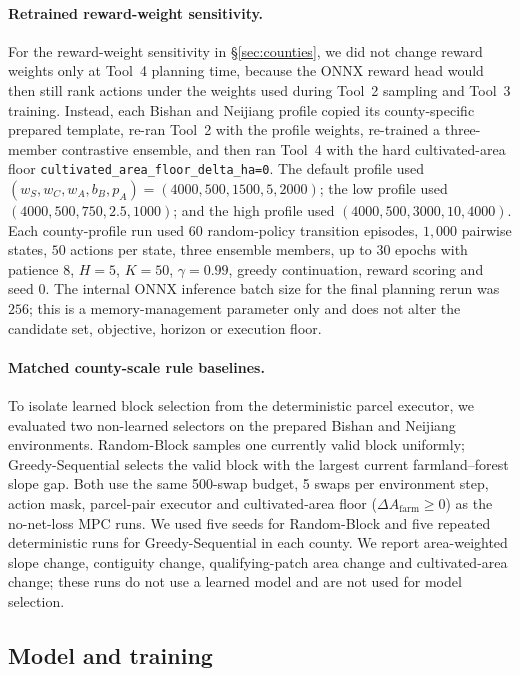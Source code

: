 \documentclass[11pt]{article}
\begin{document}
\paragraph{Retrained reward-weight sensitivity.}\label{sec:methods-reward-sensitivity}
For the reward-weight sensitivity in \S\ref{sec:counties}, we did not change reward weights only at Tool~4 planning time, because the ONNX reward head would then still rank actions under the weights used during Tool~2 sampling and Tool~3 training. Instead, each Bishan and Neijiang profile copied its county-specific prepared template, re-ran Tool~2 with the profile weights, re-trained a three-member contrastive ensemble, and then ran Tool~4 with the hard cultivated-area floor \texttt{cultivated\_area\_floor\_delta\_ha=0}. The default profile used $(w_S,w_C,w_A,b_B,p_A)=(4000,500,1500,5,2000)$; the low profile used $(4000,500,750,2.5,1000)$; and the high profile used $(4000,500,3000,10,4000)$. Each county-profile run used $60$ random-policy transition episodes, $1{,}000$ pairwise states, $50$ actions per state, three ensemble members, up to $30$ epochs with patience $8$, $H{=}5$, $K{=}50$, $\gamma{=}0.99$, greedy continuation, reward scoring and seed $0$. The internal ONNX inference batch size for the final planning rerun was $256$; this is a memory-management parameter only and does not alter the candidate set, objective, horizon or execution floor.

\paragraph{Matched county-scale rule baselines.}\label{sec:methods-rule-baselines}
To isolate learned block selection from the deterministic parcel executor, we evaluated two non-learned selectors on the prepared Bishan and Neijiang environments. Random-Block samples one currently valid block uniformly; Greedy-Sequential selects the valid block with the largest current farmland--forest slope gap. Both use the same 500-swap budget, 5 swaps per environment step, action mask, parcel-pair executor and cultivated-area floor ($\Delta A_{\mathrm{farm}}\geq0$) as the no-net-loss MPC runs. We used five seeds for Random-Block and five repeated deterministic runs for Greedy-Sequential in each county. We report area-weighted slope change, contiguity change, qualifying-patch area change and cultivated-area change; these runs do not use a learned model and are not used for model selection.

\subsection{Model and training}
\end{document}
